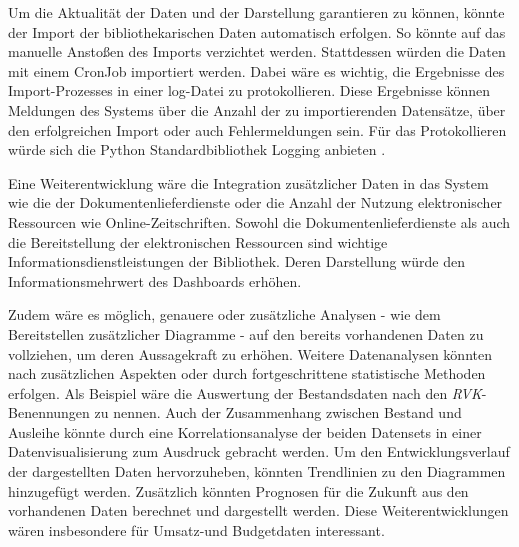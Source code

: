 Um die Aktualität der Daten und der Darstellung garantieren zu können, könnte der Import der bibliothekarischen Daten automatisch erfolgen. So könnte auf das manuelle
Anstoßen des Imports verzichtet werden. Stattdessen würden die Daten mit einem CronJob importiert werden. Dabei wäre es wichtig, die Ergebnisse des Import-Prozesses in einer log-Datei zu protokollieren. 
Diese Ergebnisse können Meldungen des Systems über die Anzahl der zu importierenden Datensätze, über den erfolgreichen Import oder auch Fehlermeldungen sein.
Für das Protokollieren würde sich die Python Standardbibliothek Logging anbieten \cite[vgl.][]{sajip_logging_2021}.

Eine Weiterentwicklung wäre die Integration zusätzlicher Daten in das System wie die der Dokumentenlieferdienste oder die Anzahl der Nutzung elektronischer Ressourcen wie Online-Zeitschriften. 
Sowohl die Dokumentenlieferdienste als auch die Bereitstellung der elektronischen Ressourcen sind wichtige Informationsdienstleistungen der Bibliothek. 
Deren Darstellung würde den Informationsmehrwert des Dashboards erhöhen.


Zudem wäre es möglich, genauere oder zusätzliche Analysen - wie dem Bereitstellen zusätzlicher Diagramme - auf den bereits vorhandenen Daten zu vollziehen, um deren Aussagekraft zu erhöhen.
Weitere Datenanalysen könnten nach zusätzlichen Aspekten oder durch fortgeschrittene statistische Methoden erfolgen. Als Beispiel wäre die Auswertung der Bestandsdaten nach den \textit{\acrshort{RVK}}-Benennungen
zu nennen. Auch der Zusammenhang zwischen Bestand und Ausleihe könnte durch eine Korrelationsanalyse der beiden Datensets in einer Datenvisualisierung zum Ausdruck gebracht werden.
Um den Entwicklungsverlauf der dargestellten Daten hervorzuheben, könnten Trendlinien zu den Diagrammen hinzugefügt werden. Zusätzlich könnten Prognosen
für die Zukunft aus den vorhandenen Daten berechnet und dargestellt werden. Diese Weiterentwicklungen wären insbesondere für Umsatz-und Budgetdaten interessant.




